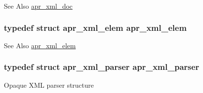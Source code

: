 \begin{DoxySeeAlso}{See Also}
\hyperlink{structapr__xml__doc}{apr\-\_\-xml\-\_\-doc} 
\end{DoxySeeAlso}
\hypertarget{group___a_p_r___util___x_m_l_ga31390d11ec04137c925ddf43c2223270}{
\subsubsection[{apr\-\_\-xml\-\_\-elem}]{\setlength{\rightskip}{0pt plus 5cm}typedef struct {\bf apr\-\_\-xml\-\_\-elem} {\bf apr\-\_\-xml\-\_\-elem}}}\label{group___a_p_r___util___x_m_l_ga31390d11ec04137c925ddf43c2223270}
\begin{DoxySeeAlso}{See Also}
\hyperlink{structapr__xml__elem}{apr\-\_\-xml\-\_\-elem} 
\end{DoxySeeAlso}
\hypertarget{group___a_p_r___util___x_m_l_gab08a1c255615afda782318811a5053d9}{
\subsubsection[{apr\-\_\-xml\-\_\-parser}]{\setlength{\rightskip}{0pt plus 5cm}typedef struct {\bf apr\-\_\-xml\-\_\-parser} {\bf apr\-\_\-xml\-\_\-parser}}}\label{group___a_p_r___util___x_m_l_gab08a1c255615afda782318811a5053d9}
Opaque X\-M\-L parser structure 

